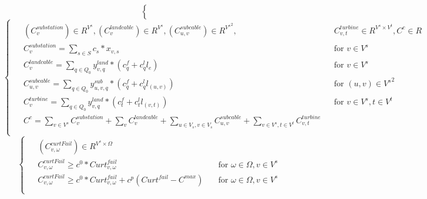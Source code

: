 \documentclass[a4paper,12pt]{article}
\begin{document}
\begin {enumerate}
{\begin{equation}
\begin{cases}
\begin{alignedat}{2}
            \end{alignedat}
        \end{cases}
    \end{equation}
    \begin{equation}
        \begin{cases}
            \begin{alignedat} {2}
                & (C_{v}^{substation}) \in R^{V^{s}}, (C_{v}^{landcable}) \in R^{V^{s}}, (C_{u,v}^{subcable}) \in R^{{V^{s}}^{2}},&& C_{v,t}^{turbine} \in R^{V^{s} \times V^{t}}, C^{c} \in R \\
                & C_{v}^{substation} = \sum_{s \in S} c_{s} * x_{v, s} && \text{for }  v \in V^{s} \\
                & C_{v}^{landcable} = \sum_{q \in Q_0} y_{v,q}^{land}*(c_{q}^{f} + c_{q}^{l} l_{e}) && \text{for }  v \in V^{s} \\
                & C_{u,v}^{subcable} = \sum_{q \in Q_0} y_{u,v,q}^{sub} * (c_{q}^{f}+c_{q}^{l} l_{(u,v)}) && \text{for }  (u,v) \in {V^{s}}^{2} \\
                & C_{v}^{turbine} = \sum_{q \in Q_0} y_{v,q}^{land}*(c_{t}^{f} + c_{t}^{l} l_{(v,t)}) && \text{for }  v \in V^{s}, t \in V^{t} \\
                & C^{c} = \sum_{v \in V^s} C_{v}^{substation} + \sum_{v} C_{v}^{landcable} + \sum_{u \in V_{s},v \in V_{s}} C_{u,v}^{subcable} + \sum_{v \in V^s, t \in V^{t}} C_{v,t}^{turbine} \\
            \end{alignedat}
        \end{cases}
    \end{equation}
    \begin{equation}
        \begin{cases}
            \begin{alignedat}{2}
                & (C_{v,\omega}^{curtFail}) \in R^{V^{s} \times \Omega} \\
                & C_{v,\omega}^{curtFail} \geq c^{0}*Curt_{v,\omega}^{fail} & \quad  \text{for } \omega \in\Omega, v \in V^{s} \\
                & C_{v,\omega}^{curtFail} \geq c^{0}*Curt_{v,\omega}^{fail} + c^{p}(Curt^{fail}-C^{max}) & \quad  \text{for } \omega \in\Omega, v \in V^{s} \\
            \end{alignedat}
        \end{cases}
    \end{equation}
    \begin{equation}

\end{equation}}
\end{enumerate}
\end{document}
